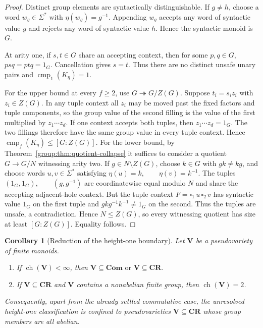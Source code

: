 \documentclass[10pt,a4paper]{article}
\newtheorem{corollary}[theorem]{Corollary}
\theoremstyle{definition}
\theoremstyle{remark}
\newcommand{\cmp}{\operatorname{cmp}}
\newcommand{\blank}{\square}
\begin{document}
\begin{proof}
Distinct group elements are syntactically distinguishable. If \(g\neq h\),
choose a word \(w_g\in\Sigma^*\) with \(\eta(w_g)=g^{-1}\). Appending
\(w_g\) accepts any word of syntactic value \(g\) and rejects any word of
syntactic value \(h\). Hence the syntactic monoid is \(G\).

At arity one, if \(s,t\in G\) share an accepting context, then for some
\(p,q\in G\), \(psq=ptq=1_G\). Cancellation gives \(s=t\). Thus there
are no distinct unsafe unary pairs and \(\cmp_1(K_\eta)=1\).

For the upper bound at every \(f\ge2\), use \(G\twoheadrightarrow G/Z(G)\).
Suppose \(t_i=s_i z_i\) with \(z_i\in Z(G)\). In any tuple context all
\(z_i\) may be moved past the fixed factors and tuple components, so the group
value of the second filling is the value of the first multiplied by
\(z_1\cdots z_d\). If one context accepts both tuples, then
\(z_1\cdots z_d=1_G\). The two fillings therefore have the same group value
in every tuple context. Hence \(\cmp_f(K_\eta)\le [G:Z(G)].\) For the lower bound, by Theorem~\ref{group:thm:quotient-collapse} it suffices
to consider a quotient \(G\to G/N\) witnessing arity two. If
\(g\in N\setminus Z(G)\), choose \(k\in G\) with \(gk\neq kg\), and choose
words \(u,v\in\Sigma^*\) satisfying
\(\eta(u)=k, \qquad \eta(v)=k^{-1}.\)
The tuples
\((1_G,1_G), \qquad (g,g^{-1})\)
are coordinatewise equal modulo \(N\) and share the accepting adjacent-hole
context. But the tuple context
\(F=\blank_1\,u\,\blank_2\,v\)
has syntactic value \(1_G\) on the first tuple and \(gkg^{-1}k^{-1}\neq1_G\) on the second. Thus the tuples are unsafe, a contradiction. Hence
\(N\le Z(G)\), so every witnessing quotient has size at least
\([G:Z(G)]\). Equality follows.
\end{proof}

\begin{corollary}[Reduction of the height-one boundary]
\label{height:cor:height-one-reduction}
Let \(\mathbf V\) be a pseudovariety of finite monoids.
\begin{enumerate}[label=\textup{(\roman*)},leftmargin=*]
\item If \(\operatorname{ch}(\mathbf V)<\infty\), then
\(
 \mathbf V\subseteq\mathbf{Com}
 \text{ or }
 \mathbf V\subseteq\mathbf{CR}.
\)
\item If \(\mathbf V\subseteq\mathbf{CR}\) and \(\mathbf V\) contains a
nonabelian finite group, then \(\operatorname{ch}(\mathbf V)=2\).
\end{enumerate}
Consequently, apart from the already settled commutative case, the unresolved
height-one classification is confined to pseudovarieties
\(\mathbf V\subseteq\mathbf{CR}\) whose group members are all abelian.
\end{corollary}
\end{document}
